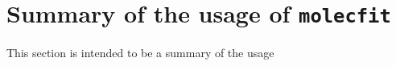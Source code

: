 \section{Summary of the usage of \texttt{molecfit}}\label{app:mf}
This section is intended to be a summary of the usage
